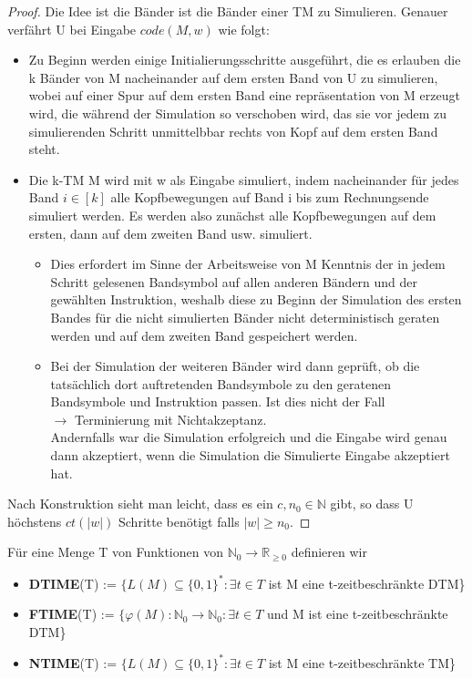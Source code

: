     \begin{proof}
        Die Idee ist die Bänder ist die Bänder einer TM zu Simulieren. Genauer verfährt U bei Eingabe \(code (M, w)\) wie folgt:
        \begin{itemize}
            \item Zu Beginn werden einige Initialierungsschritte ausgeführt, die es erlauben die k Bänder von M nacheinander auf dem ersten Band von U zu simulieren, wobei auf einer Spur auf dem ersten Band eine repräsentation von M erzeugt wird, die während der Simulation so verschoben wird, das sie vor jedem zu simulierenden Schritt unmittelbbar rechts von Kopf auf dem ersten Band steht. 
            \item Die k-TM M wird mit w als Eingabe simuliert, indem nacheinander für jedes Band \(i \in [k]\) alle Kopfbewegungen auf Band i bis zum Rechnungsende simuliert werden. Es werden also zunächst alle Kopfbewegungen auf dem ersten, dann auf dem zweiten Band usw. simuliert.
            \begin{itemize}
                \item Dies erfordert im Sinne der Arbeitsweise von M Kenntnis der in jedem Schritt gelesenen Bandsymbol auf allen anderen Bändern und der gewählten Instruktion, weshalb diese zu Beginn der Simulation des ersten Bandes für die nicht simulierten Bänder nicht deterministisch geraten werden und auf dem zweiten Band gespeichert werden.
                \item Bei der Simulation der weiteren Bänder wird dann geprüft, ob die tatsächlich dort auftretenden Bandsymbole zu den geratenen Bandsymbole und Instruktion passen. Ist dies nicht der Fall \\ \(\rightarrow\) Terminierung mit Nichtakzeptanz.\\ Andernfalls war die Simulation erfolgreich und die Eingabe wird genau dann akzeptiert, wenn die Simulation die Simulierte Eingabe akzeptiert hat.
            \end{itemize}
        \end{itemize} 
        Nach Konstruktion sieht man leicht, dass es ein \(c, n_0 \in \mathbb{N}\) gibt, so dass U höchstens \(ct(|w|)\) Schritte benötigt falls \(|w| \geq n_0\).
    \end{proof}
    Für eine Menge T von Funktionen von \(\mathbb{N}_0 \to \mathbb{R}_{\geq 0}\) definieren wir
    \begin{itemize}
        \item \textbf{DTIME}(T) := \(\{L(M) \subseteq \{0, 1\}^* : \exists t \in T\) ist M eine t-zeitbeschränkte DTM\}
        \item \textbf{FTIME}(T) := \(\{\varphi(M) : \mathbb{N}_0 \to \mathbb{N}_0 : \exists t \in T\) und M ist eine t-zeitbeschränkte DTM\}
        \item \textbf{NTIME}(T) := \(\{L(M) \subseteq \{0, 1\}^* : \exists t \in T\) ist M eine t-zeitbeschränkte TM\}
    \end{itemize}

